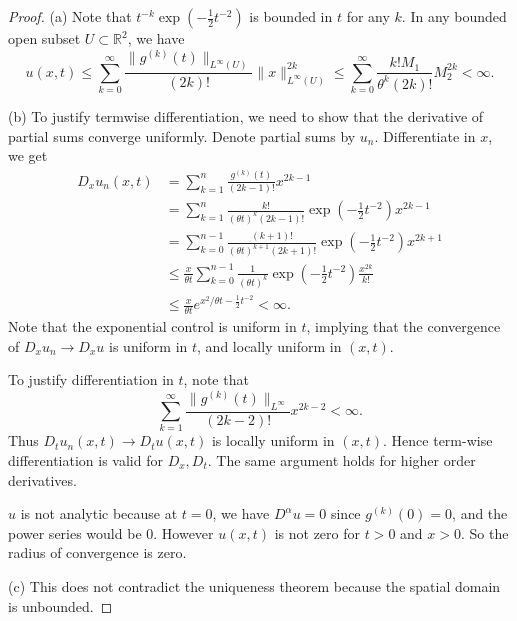 \begin{proof}
	(a) Note that $t^{- k} \exp\left( - \frac{1}{2}t^{-2} \right) $ is bounded in $t$ for any $k$.
	In any bounded open subset $U \subset \mathbb{R}^2$, we have
	\[
		u(x, t) \le \sum_{k=0}^{\infty} \frac{\|g^{(k)}(t)\|_{L^\infty (U)}}{(2k)!} \|x\|_{L^\infty (U)}^{2k}
		\le \sum_{k=0}^{\infty} \frac{k! M_1}{\theta^k (2 k)!} M_2^{2k} < \infty 
	.\] 

	(b) To justify termwise differentiation, we need to show that the derivative of partial sums converge uniformly. Denote partial sums by $u_n$. Differentiate in $x$, we get
	\begin{align*}
		D_x u_n(x,t) 
		&= \sum_{k=1}^{n} \frac{g^{(k)}(t)}{(2k-1)!}x^{2k-1} \\
		&= \sum_{k=1}^{n} \frac{k!}{(\theta t)^k(2k-1)!}\exp\left( - \frac{1}{2} t^{-2} \right)  x^{2k-1} \\
		&= \sum_{k=0}^{n-1} \frac{(k+1)!}{(\theta t)^{k+1} (2 k + 1)!} \exp\left( - \frac{1}{2} t^{-2} \right) x^{2 k + 1} \\
		&\leq \frac{x}{\theta t} \sum_{k=0}^{n-1} \frac{1}{(\theta t)^{k} } \exp\left( - \frac{1}{2} t^{-2} \right) \frac{x^{2k}}{k!} \\
		&\leq \frac{x}{\theta t} e^{x^2 / \theta t - \frac{1}{2} t^{-2}} < \infty 
	.\end{align*}  
	Note that the exponential control is uniform in $t$, implying that the convergence of $D_x u_n \to  D_x u$ is uniform in $t$, and locally uniform in $(x,t)$. 

	To justify differentiation in $t$, note that
	\[
		\sum_{k=1}^{\infty} \frac{\|g^{(k)}(t)\|_{L^\infty }}{(2 k - 2)!} x^{2 k - 2} < \infty 
	.\] 
	Thus $D_t u_n(x,t) \to  D_t u(x,t)$ is locally uniform in $(x, t)$.
	Hence term-wise differentiation is valid for $D_x, D_t$. The same argument holds for higher order derivatives.

	$u$ is not analytic because at $t = 0$, we have $D^\alpha u = 0$ since $g^{(k)}(0) = 0$, and the power series would be $0$. However $u(x,t)$ is not zero for $t >0$ and $x > 0$. So the radius of convergence is zero.

	(c) This does not contradict the uniqueness theorem because the spatial domain is unbounded.  
\end{proof}


